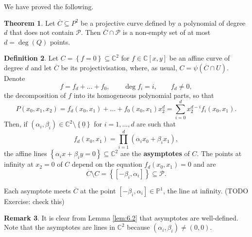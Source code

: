 \documentclass{article}
\newcommand{\C}{\mathbb{C}}
\renewcommand{\P}{\mathbb{P}}
\newcommand{\rb}[1]{\left( #1 \right)}
\renewcommand{\sb}[1]{\left[ #1 \right]}
\newcommand{\cb}[1]{\left\{ #1 \right\}}
\theoremstyle{definition}\newtheorem{definition}{Definition}[section]
\theoremstyle{definition}\newtheorem{notation}[definition]{Notation}
\theoremstyle{definition}\newtheorem{remark}[definition]{Remark}
\theoremstyle{definition}\newtheorem{example}[definition]{Example}
\theoremstyle{definition}\newtheorem{fact}{Fact}
\theoremstyle{definition}\newtheorem{exercise}{Exercise}
\newtheorem{theorem}[definition]{Theorem}
\begin{document}
We have proved the following.

\begin{theorem}
Let $ \overline{C} \subseteq P^2 $ be a projective curve defined by a polynomial of degree $ d $ that does not contain $ \mathcal{P} $. Then $ \overline{C} \cap \mathcal{P} $ is a non-empty set of at most $ d = \deg\rb{Q} $ points.
\end{theorem}

\begin{definition}
Let $ C = \cb{f = 0} \subseteq \C^2 $ for $ f \in \C\sb{x, y} $ be an affine curve of degree $ d $ and let $ \overline{C} $ be its projectivisation, where, as usual, $ C = \psi\rb{\overline{C} \cap U} $. Denote
$$ f = f_d + \dots + f_0, \qquad \deg f_i = i, \qquad f_d \ne 0, $$
the decomposition of $ f $ into its homogeneous polynomial parts, so that
$$ P\rb{x_0, x_1, x_2} = f_d\rb{x_0, x_1} + \dots + f_0\rb{x_0, x_1}x_2^d = \sum_{i = 0}^d x_2^{d - i}f_i\rb{x_0, x_1}. $$
Then, if $ \rb{\alpha_i, \beta_i} \in \C^2 \setminus \cb{\underline{0}} $ for $ i = 1, \dots, d $ are such that
$$ f_d\rb{x_0, x_1} = \prod_{i = 1}^d \rb{\alpha_ix_0 + \beta_ix_1}, $$
the affine lines $ \cb{\alpha_ix + \beta_iy = 0} \subseteq \C^2 $ are the \textbf{asymptotes} of $ C $. The points at infinity at $ x_2 = 0 $ of $ C $ depend on the equation $ f_d\rb{x_0, x_1} = 0 $ and are
$$ \overline{C} \setminus C = \cb{\sb{-\beta_i, \alpha_i}} \subseteq \mathcal{P}. $$
\end{definition}

Each asymptote meets $ \overline{C} $ at the point $ \sb{-\beta_i, \alpha_i} \in \P^1 $, the line at infinity. (TODO Exercise: check this)

\begin{remark}
It is clear from Lemma \ref{lem:6.2} that asymptotes are well-defined. Note that the asymptotes are lines in $ \C^2 $ because $ \rb{\alpha_i, \beta_i} \ne \rb{0, 0} $.
\end{remark}
\end{document}
